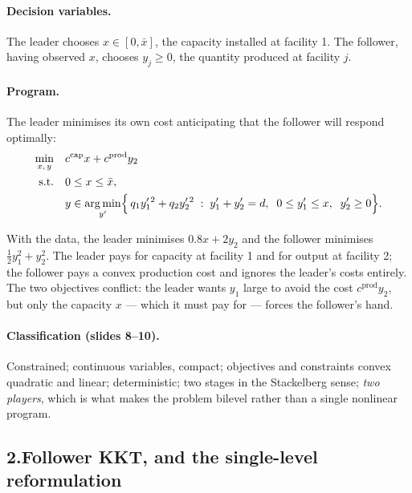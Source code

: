 \documentclass[11pt]{article}
\DeclareMathOperator*{\minimize}{min}
\DeclareMathOperator*{\argmin}{arg\,min}
\theoremstyle{definition}
\begin{document}
\paragraph{Decision variables.} The leader chooses $x \in [0,\bar{x}]$,
the capacity installed at facility 1. The follower, having observed
$x$, chooses $y_j \ge 0$, the quantity produced at facility $j$.

\paragraph{Program.} The leader minimises its own cost anticipating
that the follower will respond optimally:
\begin{equation}\label{eq:p2bilevel}
\begin{aligned}
  \minimize_{x,\,y}\quad & c^{\mathrm{cap}} x + c^{\mathrm{prod}} y_2\\
  \text{s.t.}\quad & 0 \le x \le \bar{x},\\
  & y \in \argmin_{y'}\Bigl\{\,
      q_1 y_1'^{\,2} + q_2 y_2'^{\,2}
      \;:\; y_1' + y_2' = d,\;\; 0 \le y_1' \le x,\;\; y_2' \ge 0
      \Bigr\}.
\end{aligned}
\end{equation}

With the data, the leader minimises $0.8x + 2y_2$ and the follower
minimises $\tfrac12 y_1^2 + y_2^2$. The leader pays for capacity at
facility 1 and for output at facility 2; the follower pays a convex
production cost and ignores the leader's costs entirely. The two
objectives conflict: the leader wants $y_1$ large to avoid the cost
$c^{\mathrm{prod}} y_2$, but only the capacity $x$ --- which it must
pay for --- forces the follower's hand.

\paragraph{Classification (slides 8--10).} Constrained; continuous
variables, compact; objectives and constraints convex quadratic and
linear; deterministic; two stages in the Stackelberg sense; \emph{two
players}, which is what makes the problem bilevel rather than a single
nonlinear program.

\subsection*{2.\quad Follower KKT, and the single-level reformulation}
\end{document}
